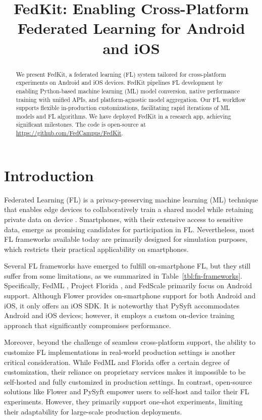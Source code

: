 \documentclass[letterpaper]{article} %
\title{FedKit: Enabling Cross-Platform Federated Learning for Android and iOS}
\author{}
\begin{document}
\maketitle

\begin{abstract}
    We present FedKit, a federated learning (FL) system tailored for
    cross-platform experiments on Android and iOS devices.
    FedKit pipelines FL development by
    enabling Python-based machine learning (ML) model conversion,
    native performance training with unified APIs,
    and platform-agnostic model aggregation.
    Our FL workflow supports flexible in-production customizations,
    facilitating rapid iterations of ML models and FL algorithms.
    We have deployed FedKit in a research app,
    achieving significant milestones.
    The code is open-source at \url{https://github.com/FedCampus/FedKit}.
\end{abstract}

\section{Introduction}

Federated Learning (FL) 
is a privacy-preserving machine learning (ML) technique
that enables edge devices to collaboratively train a shared model while
retaining private data on device \cite{mcmahan2017communication}.
Smartphones, with their extensive access to sensitive data,
emerge as promising candidates for participation in FL.
Nevertheless, most FL frameworks
\cite[e.g.,][]{bonawitz2019towards,liu2021fate,ma2019paddlepaddle,openfl_citation}
available today are primarily designed for simulation purposes,
which restricts their practical applicability on smartphones.

Several FL frameworks have emerged to fulfill on-smartphone FL,
but they still suffer from some limitations,
as we summarized in Table~\ref{tbl:fn-frameworks}.
Specifically, FedML \cite{he2020fedml},
Project Florida \cite{madrigal2023project},
and FedScale \cite{lai2022fedscale} primarily focus on Android support.
Although Flower \cite{beutel2020flower,mathur2021ondevice} provides
on-smartphone support for both Android and iOS, it only offers an iOS SDK.
It is noteworthy that PySyft \cite{ryffel2018generic,Ziller2021,hall2021syft}
accommodates Android and iOS devices;
however, it employs a custom on-device training approach that
significantly compromises performance.

Moreover, beyond the challenge of seamless cross-platform support,
the ability to customize FL implementations in real-world production settings is
another critical consideration.
While FedML and Florida offer a certain degree of customization,
their reliance on proprietary services makes it impossible to be self-hosted and
fully customized in production settings.
In contrast, open-source solutions like Flower and PySyft empower users to
self-host and tailor their FL experiments.
However, they primarily support one-shot experiments,
limiting their adaptability for large-scale production deployments.
\end{document}
